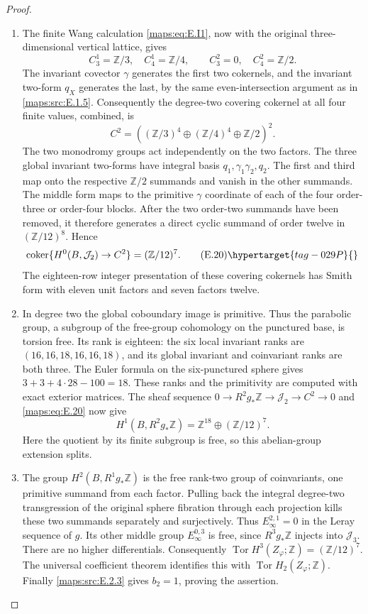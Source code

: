 \begin{proof}
\begin{enumerate}[label={$\langle1\rangle$\arabic*.},leftmargin=*]
\item The finite Wang calculation \eqref{maps:eq:E.I1}, now with the original
three-dimensional vertical lattice, gives
\[
 C_3^1=\mathbb Z/3,\quad C_4^1=\mathbb Z/4,
 \qquad C_3^2=0,\quad C_4^2=\mathbb Z/2.
\]
The invariant covector \(\gamma\) generates the first two
cokernels, and the invariant two-form \(q_X\) generates the
last, by the same even-intersection argument as in \ref{maps:src:E.1.5}.
Consequently the degree-two covering cokernel at all four
finite values, combined, is
\[
 C^2=\left((\mathbb Z/3)^4\oplus
                 (\mathbb Z/4)^4\oplus\mathbb Z/2\right)^2.
\]
The two monodromy groups act independently on the two factors.
The three global invariant two-forms have integral basis
\(q_1,\gamma_1\gamma_2,q_2\). The first and third map
onto the respective \(\mathbb Z/2\) summands and vanish
in the other summands. The middle form maps to the primitive
\(\gamma\) coordinate of each of the four order-three or
order-four blocks. After the two order-two summands have
been removed, it therefore generates a direct cyclic summand
of order twelve in \((\mathbb Z/12)^8\). Hence
\[
 \operatorname{coker}\{H^0(B,\mathcal J_2)\to C^2\}
      =(\mathbb Z/12)^7.
 \tag{E.20}\hypertarget{tag-029P}{}\label{maps:eq:E.20}
\]
The eighteen-row integer presentation of these covering cokernels has
Smith form with eleven unit factors and seven factors twelve.

\item In degree two the global coboundary image is primitive.
Thus the parabolic group, a subgroup of the free-group
cohomology on the punctured base, is torsion free. Its rank
is eighteen: the six local invariant ranks are
\((16,16,18,16,16,18)\), and its global invariant and
coinvariant ranks are both three. The Euler formula on the
six-punctured sphere gives \(3+3+4\cdot28-100=18\).
These ranks and the primitivity are computed with exact exterior matrices. The sheaf sequence
\(0\to R^2g_*\mathbb Z\to\mathcal J_2\to C^2\to0\)
and \eqref{maps:eq:E.20} now give
\[
 H^1(B,R^2g_*\mathbb Z)
     =\mathbb Z^{18}\oplus(\mathbb Z/12)^7.
\]
Here the quotient by its finite subgroup is free, so this
abelian-group extension splits.

\item The group \(H^2(B,R^1g_*\mathbb Z)\) is the free
rank-two group of coinvariants, one primitive summand from
each factor. Pulling back the integral degree-two
transgression of the original sphere fibration through each
projection kills these two summands separately and
surjectively. Thus \(E_\infty^{2,1}=0\) in the Leray
sequence of \(g\). Its other middle group
\(E_\infty^{0,3}\) is free, since \(R^3g_*\mathbb Z\)
injects into \(\mathcal J_3\). There are no higher
differentials. Consequently
\(\operatorname{Tor}H^3(Z_\varphi;\mathbb Z)
=(\mathbb Z/12)^7\). The universal coefficient theorem
identifies this with \(\operatorname{Tor}H_2(Z_\varphi;\mathbb Z)\).
Finally \ref{maps:src:E.2.3} gives \(b_2=1\), proving the assertion.
\end{enumerate}
\end{proof}


